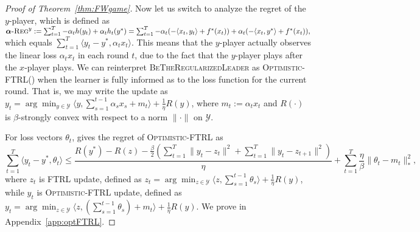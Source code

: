 \documentclass[final,12pt]{colt2018} %
\def\balpha{\boldsymbol{\alpha}}
\def\BTRL{\textsc{BeTheRegularizedLeader}\xspace}
\def\OFTRL{\textsc{Optimistic-FTRL}\xspace}
\newcommand{\regret}[1]{\balpha\textsc{-Reg}^{#1}}
\newcommand{\YY}{\mathcal{Y}}
\begin{document}
\begin{proof}[Proof of Theorem~\ref{thm:FWgame}]
	Now let us switch to analyze the regret of the $y$-player, which is defined as
$\textstyle	\regret{y}   :=  \sum_{t=1}^{T} - \alpha_t h(y_t) + \alpha_t h_t(y^*)
	= \sum_{t=1}^{T} -\alpha_t  ( - \langle x_t, y_t \rangle + f^*(x_t) ) + \alpha_t (- \langle x_t, y^* \rangle + f^*(x_t) ),$
	which equals $\sum_{t=1}^{T} \langle y_t - y^{*}, \alpha_t x_{t} \rangle$.
	This means that the $y$-player actually observes the linear loss $\alpha_t x_{t}$ in each round $t$, due to the fact that the $y$-player plays after the $x$-player plays. 
	We can reinterpret \BTRL as \OFTRL (\cite{SALS15}) when the learner is fully informed as to the loss function for the current round. That is, we may write the update as
	$y_{t} = \arg\min_{y \in \YY} \langle y , \sum_{s=1}^{t-1} \alpha_s x_{s} + m_t \rangle + \frac{1}{\eta} R(y)$, where $m_{t}:=\alpha_t x_{t}$ and $R(\cdot)$ is $\beta$-strongly convex with respect to a norm $\|\cdot\|$ on $\YY$.
	
	For loss vectors $\theta_t$,  gives the regret of \OFTRL as 
	\begin{equation} 
\textstyle\sum_{t=1}^{T} \langle y_t - y^{*}, \theta_{t} \rangle 
	\leq \frac{ R(y^*) - R(z)- 
\frac{\beta}{2} (\sum_{{t=1}}^{T} \| y_t - z_t \|^2 + \sum_{{t=1}}^{T} \| y_{t} - z_{t+1} \|^2)}{\eta} +
	\sum_{t=1}^{T} \frac{\eta}{\beta} \| \theta_t - m_{t} \|^2_* ,
	\end{equation}
	where $z_{{t}}$ is FTRL update, defined as $z_{t} = \arg\min_{z \in \YY}  \langle z, \sum_{s=1}^{t-1} \theta_s \rangle +  \frac{1}{\eta} R(y)$, while $y_{t}$ is \OFTRL update, defined as 
	$y_{t} = \arg\min_{z \in \YY}  \langle z, ( \sum_{s=1}^{t-1} \theta_s )  + m_t \rangle  + \frac{1}{\eta} R(y)$.
     We prove  in Appendix~\ref{app:optFTRL}.
	

\end{proof}
\end{document}
